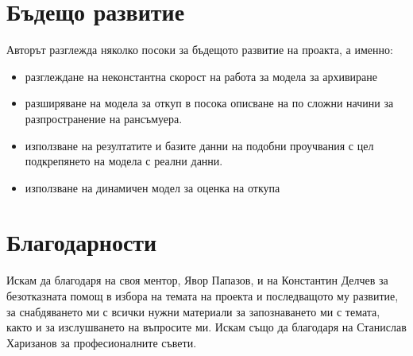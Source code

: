 \documentclass[11pt, a4paper]{article}
\theoremstyle{definition}
\begin{document}
	\section{Бъдещо развитие}
		Авторът разглежда няколко посоки за бъдещото развитие на проакта, а именно:
		\begin{itemize}
			\item разглеждане на неконстантна скорост на работа за модела за архивиране
			\item разширяване на модела за откуп в посока описване на по сложни начини за разпространение на рансъмуера.
			\item използване на резултатите и базите данни на подобни проучвания с цел подкрепянето на модела с реални данни.\cite{paquet2019ransomware}
			\item използване на динамичен модел за оценка на откупа
		\end{itemize}
	\section{Благодарности}
		Искам да благодаря на своя ментор, Явор Папазов, и на Константин Делчев за безотказната помощ в избора на темата на проекта и последващото му развитие, за снабдяването ми с всички нужни материали за запознаването ми с темата, както и за изслушването на въпросите ми. Искам също да благодаря на Станислав Харизанов за професионалните съвети.
\nocite{*}


\end{document}
